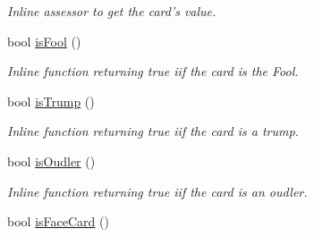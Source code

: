 \begin{DoxyCompactItemize}
\begin{DoxyCompactList}\small\item\em \-Inline assessor to get the card's value. \end{DoxyCompactList}\item 
\hypertarget{classCard_a6728e1f5451d4eebd83b925363c53ab9}{bool \hyperlink{classCard_a6728e1f5451d4eebd83b925363c53ab9}{is\-Fool} ()}\label{classCard_a6728e1f5451d4eebd83b925363c53ab9}

\begin{DoxyCompactList}\small\item\em \-Inline function returning true iif the card is the \-Fool. \end{DoxyCompactList}\item 
\hypertarget{classCard_a70fad6545c57824bbd4197f7b1af2c9c}{bool \hyperlink{classCard_a70fad6545c57824bbd4197f7b1af2c9c}{is\-Trump} ()}\label{classCard_a70fad6545c57824bbd4197f7b1af2c9c}

\begin{DoxyCompactList}\small\item\em \-Inline function returning true iif the card is a trump. \end{DoxyCompactList}\item 
\hypertarget{classCard_a4dd1af34db5f67b43ab959f71bb7aea0}{bool \hyperlink{classCard_a4dd1af34db5f67b43ab959f71bb7aea0}{is\-Oudler} ()}\label{classCard_a4dd1af34db5f67b43ab959f71bb7aea0}

\begin{DoxyCompactList}\small\item\em \-Inline function returning true iif the card is an oudler. \end{DoxyCompactList}\item 
\hypertarget{classCard_ab8f264758d02d47a381564455883c9a3}{bool \hyperlink{classCard_ab8f264758d02d47a381564455883c9a3}{is\-Face\-Card} ()}\label{classCard_ab8f264758d02d47a381564455883c9a3}


\end{DoxyCompactItemize}
